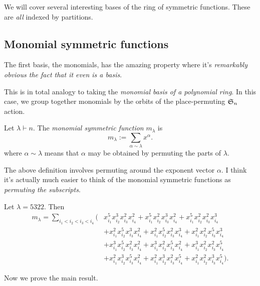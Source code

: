\documentclass{article}
\newcommand{\frkS}{\ensuremath\mathfrak{S}}
\begin{document}
We will cover several interesting bases of the ring of symmetric functions. These are \textit{all} indexed by partitions.

\subsection{Monomial symmetric functions}

The first basis, the monomials, has the amazing property where it's \textit{remarkably obvious the fact that it even is a basis}.

This is in total analogy to taking the \textit{monomial basis of a polynomial ring}. In this case, we group together monomials by the orbits of the place-permuting $\frkS_n$ action.

\begin{definition}
    Let $\lambda \vdash n$. The \textit{monomial symmetric function} $m_\lambda$ is 
    \[
        m_\lambda := \sum_{\alpha \sim \lambda} x^\alpha.
    \]
    where $\alpha \sim \lambda$ means that $\alpha$ may be obtained by permuting the parts of $\lambda$.
\end{definition}

The above definition involves permuting around the exponent vector $\alpha$. I think it's actually much easier to think of the monomial symmetric functions as \textit{permuting the subscripts}. 

\begin{example}
    Let $\lambda = 5322$. Then
    \begin{align*}
        m_\lambda = \sum_{i_1<i_2<i_3<i_4} \Big(&x_{i_1}^5x_{i_2}^3x_{i_3}^2x_{i_4}^2 + x_{i_1}^5x_{i_2}^2x_{i_3}^3x_{i_4}^2 + x_{i_1}^5x_{i_2}^2x_{i_3}^2x_{i_4}^3 \\ 
                                           &+ x_{i_1}^2x_{i_2}^5x_{i_3}^3x_{i_4}^2 + x_{i_1}^2x_{i_2}^5x_{i_3}^2x_{i_4}^3 + x_{i_1}^2x_{i_2}^2x_{i_3}^5x_{i_4}^3  \\
                                           &+ x_{i_1}^3x_{i_2}^5x_{i_3}^2x_{i_4}^2 + x_{i_1}^3x_{i_2}^2x_{i_3}^5x_{i_4}^2 + x_{i_1}^3x_{i_2}^2x_{i_3}^2x_{i_4}^5  \\
                                           &+ x_{i_1}^2x_{i_2}^3x_{i_3}^5x_{i_4}^2 + x_{i_1}^2x_{i_2}^3x_{i_3}^2x_{i_4}^5 + x_{i_1}^2x_{i_2}^2x_{i_3}^3x_{i_4}^5 \Big).
    \end{align*}
\end{example}

Now we prove the main result. 
\end{document}
